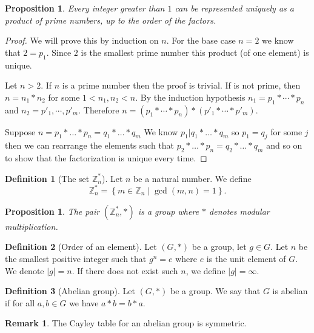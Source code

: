 \documentclass[11pt,a4paper]{article}
\theoremstyle{definition}
\newtheorem{definition}{Definition}[section]
\newtheorem{remark}{Remark}[section]
\theoremstyle{plain}
\newtheorem{proposition}[theorem]{Proposition}
\newcommand{\Z}{\mathbb{Z}}
\newcommand{\set}[2]{ \left\{ #1 \mid #2 \right\} }
\begin{document}
  \begin{proposition}
    Every integer greater than $1$ can be represented uniquely as a product of
    prime numbers, up to the order of the factors.
  \end{proposition}
  \begin{proof}
    We will prove this by induction on $n$.
  	For the base case $n = 2$ we know that $2 = p_1$.
    Since $2$ is the smallest prime number this product (of one element) is
    unique.

	  Let $n > 2$.
    If $n$ is a prime number then the proof is trivial.
    If is not prime, then $n = n_1 * n_2$ for some $1 < n_1, n_2 < n$. 
    By the induction hypothesis $n_1 = p_1 * \cdots * p_n$ and 
    $n_2 = p'_1, \cdots, p'_m$. 
    Therefore $n = (p_1 * \cdots * p_n) * (p'_1 * \cdots * p'_m)$.

    Suppose $n = p_1*\ldots *p_n=q_1*\ldots *q_m$
    We know $p_1|q_1*\ldots *q_m$ so $p_1=q_j$ for some $j$ 
    then we can rearrange the elements such that 
    $p_2*\ldots *p_n = q_2*\ldots *q_m$ and so on to show that
    the factorization is unique every time.
  \end{proof}
	
  \begin{definition}[The set $\Z^*_n$]
    Let $n$ be a natural number.
    We define
    \[
      \Z^*_n = \set{m \in \Z_n}{\gcd(m,n) = 1}.
    \]
  \end{definition}
  \begin{proposition}
    The pair $(\Z^*_n, *)$ is a group where $*$ denotes modular multiplication.
  \end{proposition}

  \begin{definition}[Order of an element]
    Let $(G,*)$ be a group, let $g \in G$.
    Let $n$ be the smallest positive integer such that $g^n = e$ where
    $e$ is the unit element of $G$. We denote $|g| = n$.
    If there does not exist such $n$, we define $|g| = \infty$.
  \end{definition}
  
  \begin{definition}[Abelian group]
    Let $(G,*)$ be a group. We say that $G$ is abelian if for all $a,b \in G$
    we have $a * b = b * a$.
  \end{definition}
  \begin{remark}
  	The Cayley table for an abelian group is symmetric.
  \end{remark}
\end{document}
